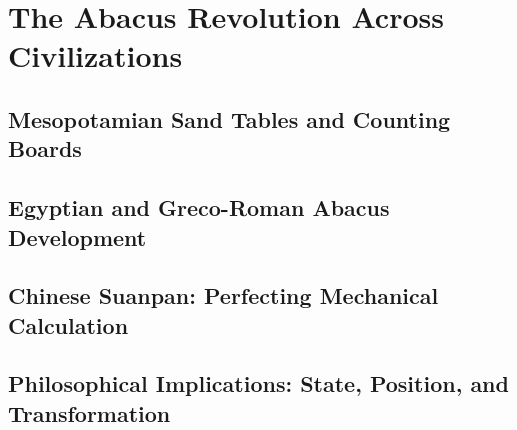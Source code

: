 
\chapter{The Abacus Revolution Across Civilizations}

\section{Mesopotamian Sand Tables and Counting Boards}

\section{Egyptian and Greco-Roman Abacus Development}

\section{Chinese Suanpan: Perfecting Mechanical Calculation}

\section{Philosophical Implications: State, Position, and Transformation}
